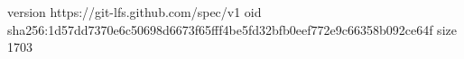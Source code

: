 version https://git-lfs.github.com/spec/v1
oid sha256:1d57dd7370e6c50698d6673f65fff4be5fd32bfb0eef772e9c66358b092ce64f
size 1703
